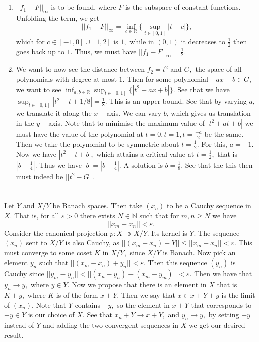 \documentclass{article}
\begin{document}
\section{} %
\begin{enumerate}
	\item $||f_1-F||_{\infty}$ is to be found, where $F$ is the subspace of constant functions. Unfolding the term, we get 
	$$||f_1-F||_{\infty}= \inf_{c \in \mathbb{R} }\{ \sup_{t \in [0,1]} |t-c|  \},$$ which for $c \in [-1,0] \cup [1,2] $ is $1,$ while in $(0,1)$ it 
	decreases to $\frac{1}{2}$ then goes back up to $1.$ Thus, we must have $||f_1-F||_{\infty}=\frac{1}{2}.$
	\item We want to now see the distance between $f_2=t^2$ and $G,$ the space of all polynomials with degree at most $1.$ Then for some polynomial $-ax-b 
	\in G,$ we want to see $\inf_{a,b \in \mathbb{R}}\sup_{t \in [0,1]}\{|t^2+ax+b|\}.$ See that we have $\sup_{t \in [0,1]} |t^2-t+1/8|=\frac{1}{8}.$ This 
	is an upper bound.  
	See that by varying $a,$ we translate it along the $x-$axis. We can vary $b$, which gives us translation in the $y-$axis. Note that to minimise the 
	maximum value of $|t^2+at+b|$ we must have the value of the polynomial at $t=0,t=1,t=\frac{-a}{2}$ be the same. Then we take the polynomial to be 
	symmetric about $t=\frac{1}{2}.$ For this, $a=-1.$ Now we have $|t^2-t+b|,$ which attains a critical value at $t=\frac{1}{2},$ that is $\left|b - 
	\frac{1}{4}\right|.$ Thus we have $|b| =\left|b-\frac{1}{4} \right|.$ A solution is $b=\frac{1}{8}.$ See that the this then must indeed be $||t^2-G||.$  
\end{enumerate}
\section{} %
Let $Y$ and $X/Y$ be Banach spaces. Then take $(x_n)$ to be a Cauchy sequence in $X.$ That is, for all $\varepsilon > 0$ there exists $N \in \mathbb{N}$ 
such that for $m,n \geq N$ we have $$||x_m-x_n||< \varepsilon.$$
Consider the canonical projection $p: X \twoheadrightarrow X/Y.$ Its kernel is $Y.$ The sequence $(x_n)$ sent to $X/Y$ is also Cauchy, as $||(x_m-x_n)+Y|| 
\leq ||x_m-x_n|| < \varepsilon.$ This must converge to some coset $K$ in $X/Y,$ since $X/Y$ is Banach. Now pick an element $y_n$ such that $||(x_m-x_n)+y_n 
||<\varepsilon.$ Then this sequence $(y_n)$ is Cauchy since $ ||y_m-y_n|| < ||(x_n-y_n)-(x_m-y_m) ||< \varepsilon.$ Then we have that $y_n \to y,$ where $y 
\in Y.$ Now we propose that there is an element in $X$ that is $K+y,$ where $K$ is of the form $x+Y.$ Then we say that $x \in x+Y + y$ is the limit of 
$(x_n).$ Note that $Y$ contains $-y,$ so the element in $x+Y$ that corresponds to $-y \in Y$ is our choice of $X.$ See that $x_n +Y \to x+Y, $ and $y_n \to 
y,$ by setting $-y$ instead of $Y$ and adding the two convergent sequences in $X$ we get our desired result.
\end{document}
